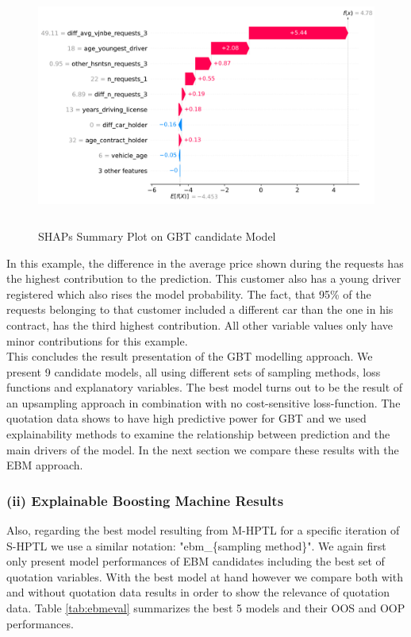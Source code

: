 \documentclass[12pt,titlepage]{article}
\begin{document}
\begin{figure}[H]
    \centerline{\includegraphics[height=8cm]{shap_waterfall_example.png}}
    \caption{SHAPs Summary Plot on GBT candidate Model}
    \label{fig:shapsum}
\end{figure}
\noindent
In this example, the difference in the average price shown during the requests has the highest contribution to the prediction. This customer also has a young driver registered which also rises the model probability. The fact, that 95\% of the requests belonging to that customer included a different car than the one in his contract, has the third highest contribution. All other variable values only have minor contributions for this example. \\
This concludes the result presentation of the GBT modelling approach. We present 9 candidate models, all using different sets of sampling methods, loss functions and explanatory variables. The best model turns out to be the result of an upsampling approach in combination with no cost-sensitive loss-function. The quotation data shows to have high predictive power for GBT and we used explainability methods to examine the relationship between prediction and the main drivers of the model. In the next section we compare these results with the EBM approach. \\

\subsubsection*{(ii) Explainable Boosting Machine Results}

Also, regarding the best model resulting from M-HPTL for a specific iteration of S-HPTL we use a similar notation: "ebm\_\{sampling method\}". We again first only present model performances of EBM candidates including the best set of quotation variables. With the best model at hand however we compare both with and without quotation data results in order to show the relevance of quotation data. Table \ref{tab:ebmeval} summarizes the best 5 models and their OOS and OOP performances.\\
\end{document}

